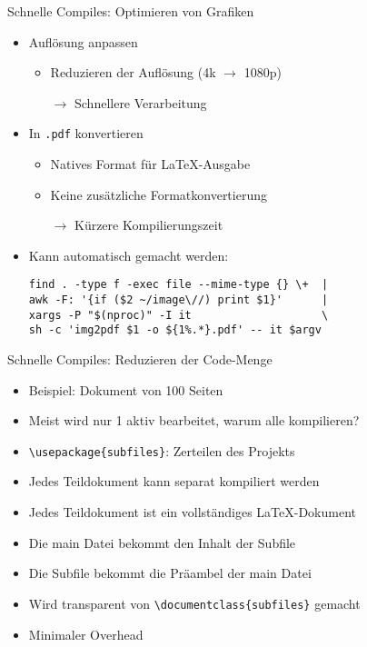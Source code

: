 \documentclass[main.tex]{subfiles}
\begin{document}
\begin{frame}[fragile]{Schnelle Compiles: Optimieren von Grafiken}
    \begin{itemize}
        \item Auflösung anpassen
        \begin{itemize}
            \item Reduzieren der Auflösung (4k $\to$ 1080p)
            \item[$\to$] Schnellere Verarbeitung
        \end{itemize}
        \pause
        \medskip
        \item In \texttt{.pdf} konvertieren
        \begin{itemize}
            \item Natives Format für \LaTeX-Ausgabe
            \item Keine zusätzliche Formatkonvertierung
            \item[$\to$] Kürzere Kompilierungszeit
        \end{itemize}
        \pause
        \medskip
        \item Kann automatisch gemacht werden:
        \begin{Verbatim}
find . -type f -exec file --mime-type {} \+  |
awk -F: '{if ($2 ~/image\//) print $1}'      |
xargs -P "$(nproc)" -I it                    \
sh -c 'img2pdf $1 -o ${1%.*}.pdf' -- it $argv
        \end{Verbatim}
    \end{itemize}
\end{frame}

\begin{frame}[fragile]{Schnelle Compiles: Reduzieren der Code-Menge}
    \begin{itemize}
        \item Beispiel: Dokument von 100 Seiten
        \item Meist wird nur 1 aktiv bearbeitet, warum alle kompilieren?
        \pause
        \bigskip
        \item \verb|\usepackage{subfiles}|: Zerteilen des Projekts
        \item Jedes Teildokument kann separat kompiliert werden
        \pause
        \bigskip
        \item Jedes Teildokument ist ein vollständiges \LaTeX-Dokument
        \item Die main Datei bekommt den Inhalt der Subfile
        \item Die Subfile bekommt die Präambel der main Datei
        \pause
        \bigskip
        \item Wird transparent von \verb|\documentclass{subfiles}| gemacht
        \item Minimaler Overhead
    \end{itemize}
\end{frame}
\end{document}

